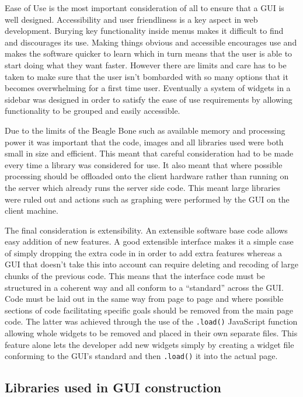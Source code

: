 	Ease of Use is the most important consideration of all to ensure that a GUI is well designed.  Accessibility and user friendliness is a key aspect in web development.  Burying key functionality inside menus makes it difficult to find and discourages its use.   Making things obvious and accessible encourages use and makes the software quicker to learn which in turn means that the user is able to start doing what they want faster.  However there are limits and care has to be taken to make sure that the user isn't bombarded with so many options that it becomes overwhelming for a first time user.  Eventually a system of widgets in a sidebar was designed in order to satisfy the ease of use requirements by allowing functionality to be grouped and easily accessible.

	Due to the limits of the Beagle Bone such as available memory and processing power it was important that the code, images and all libraries used were both small in size and efficient.  This meant that careful consideration had to be made every time a library was considered for use.  It also meant that where possible processing should be offloaded onto the client hardware rather than running on the server which already runs the server side code.  This meant large libraries were ruled out and actions such as graphing were performed by the GUI on the client machine.

	The final consideration is extensibility.  An extensible software base code allows easy addition of new features.  A good extensible interface makes it a simple case of simply dropping the extra code in in order to add extra features whereas a GUI that doesn't take this into account can require deleting and recoding of large chunks of the previous code.  This means that the interface code must be structured in a coherent way and all conform to a ``standard'' across the GUI.  Code must be laid out in the same way from page to page and where possible sections of code facilitating specific goals should be removed from the main page code.  The latter was achieved through the use of the \verb/.load()/ JavaScript function allowing whole widgets to be removed and placed in their own separate files.  This feature alone lets the developer add new widgets simply by creating a widget file conforming to the GUI's standard and then \verb/.load()/ it into the actual page.

\subsection{Libraries used in GUI construction}

